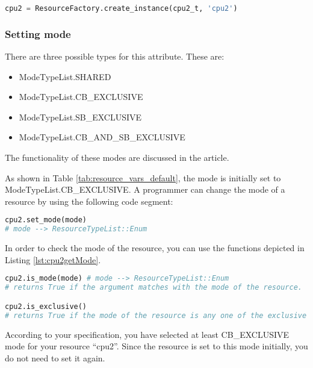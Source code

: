 \documentclass[]{scrartcl}
\begin{document}
\begin{lstlisting}[language=Python, frame=single, label={lst:cpu2activeInstantiation}, caption={Active resource instantiation using ResourceFactory class}]
cpu2 = ResourceFactory.create_instance(cpu2_t, 'cpu2')
\end{lstlisting}
        

\subsubsection{Setting mode}
There are three possible types for this attribute. These are:
\begin{itemize}
    \item \textsf{ModeTypeList.SHARED}
    \item \textsf{ModeTypeList.CB\_EXCLUSIVE}
    \item \textsf{ModeTypeList.SB\_EXCLUSIVE}
    \item \textsf{ModeTypeList.CB\_AND\_SB\_EXCLUSIVE}
\end{itemize}
The functionality of these modes are discussed in the article.

As shown in Table \ref{tab:resource_vars_default}, the mode is initially set to \textsf{ModeTypeList.CB\_EXCLUSIVE}. A programmer can change the mode of a resource by using the following code segment:

\begin{lstlisting}[language=Python, frame=single, label={lst:cpu2setMode}, caption={Setting the mode of a resource after creating a resource.}]
cpu2.set_mode(mode)
# mode --> ResourceTypeList::Enum
\end{lstlisting}
        

In order to check the mode of the resource, you can use the functions depicted in Listing \ref{lst:cpu2getMode}.

\begin{lstlisting}[language=Python, frame=single, label={lst:cpu2getMode}, caption={The functions for resource mode check.}]
cpu2.is_mode(mode) # mode --> ResourceTypeList::Enum
# returns True if the argument matches with the mode of the resource.

cpu2.is_exclusive()
# returns True if the mode of the resource is any one of the exclusive mode.
\end{lstlisting}
        
        
According to your specification, you have selected at least \textsf{CB\_EXCLUSIVE} mode for your resource ``cpu2''. Since the resource is set to this mode initially, you do not need to set it again.
        
\end{document}
